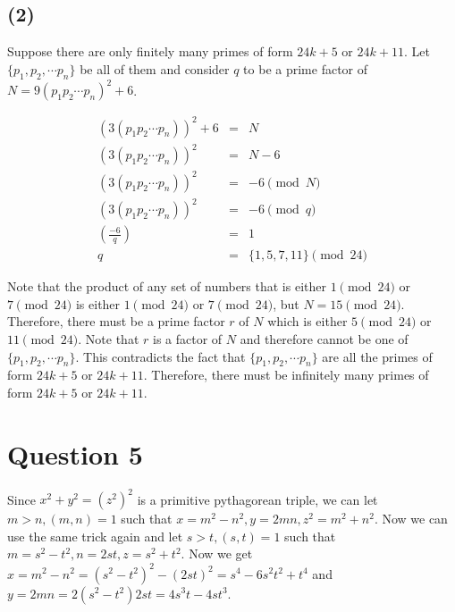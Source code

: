 \documentclass{article}
\begin{document}
\subsection*{(2)}
Suppose there are only finitely many primes of form $ 24k + 5 $ or $ 24k + 11 $. Let $ \{p_1, p_2, \cdots p_n \} $ be all of them and consider $ q $ to be a prime factor of $ N = 9(p_1 p_2 \cdots p_n)^2 + 6 $. 

\begin{eqnarray*}
  (3(p_1 p_2 \cdots p_n))^2 + 6 &=& N \\
  (3(p_1 p_2 \cdots p_n))^2 &=& N - 6 \\
  (3(p_1 p_2 \cdots p_n))^2 &=& - 6 \pmod{N} \\
  (3(p_1 p_2 \cdots p_n))^2 &=& - 6 \pmod{q} \\
  \left(\frac{-6}{q}\right) &=& 1 \\
  q &=& \{1, 5, 7, 11\} \pmod{24}
\end{eqnarray*}

Note that the product of any set of numbers that is either $ 1 \pmod{24} $ or $ 7 \pmod{24} $ is either $ 1 \pmod{24} $ or $ 7 \pmod{24} $, but $ N = 15 \pmod{24} $. Therefore, there must be a prime factor $ r $ of $ N $ which is either $ 5 \pmod{24} $ or $ 11 \pmod{24} $. Note that $ r $ is a factor of $ N $ and therefore cannot be one of $ \{ p_1, p_2, \cdots p_n \} $. This contradicts the fact that $ \{p_1, p_2, \cdots p_n \} $ are all the primes of form $ 24k + 5 $ or $ 24k + 11 $. Therefore, there must be infinitely many primes of form $ 24k + 5 $ or $ 24k + 11 $.

\section*{Question 5}
Since $ x^2 + y^2 = (z^2)^2 $ is a primitive pythagorean triple, we can let $ m > n, (m, n) = 1 $ such that $ x = m^2 - n^2, y = 2mn, z^2 = m^2 + n^2 $. Now we can use the same trick again and let $ s > t, (s, t) = 1 $ such that $ m = s^2 - t^2, n = 2st, z = s^2 + t^2 $. Now we get $ x = m^2 - n^2 = (s^2 - t^2)^2 - (2st)^2 = s^4 - 6s^2t^2 + t^4 $ and $ y = 2mn = 2(s^2 - t^2)2st = 4s^3t - 4st^3 $.
\end{document}
